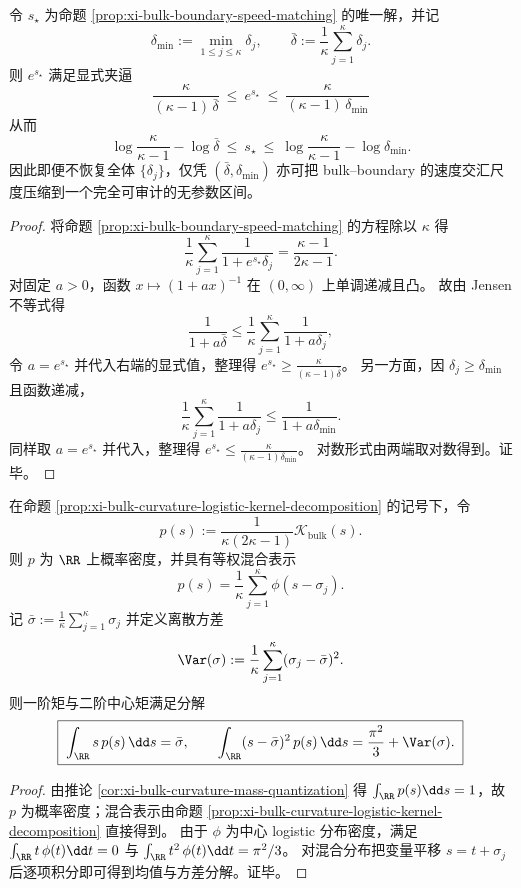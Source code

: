 \begin{corollary}\label{cor:xi-bulk-boundary-speed-matching-scale-bracketing}
令 \(s_\star\) 为命题 \ref{prop:xi-bulk-boundary-speed-matching} 的唯一解，并记
\[
\delta_{\min}:=\min_{1\le j\le\kappa}\delta_j,
\qquad
\bar\delta:=\frac{1}{\kappa}\sum_{j=1}^{\kappa}\delta_j.
\]
则 \(e^{s_\star}\) 满足显式夹逼
\[
\boxed{\;
\frac{\kappa}{(\kappa-1)\,\bar\delta}\ \le\ e^{s_\star}\ \le\ \frac{\kappa}{(\kappa-1)\,\delta_{\min}}\;}
\]
从而
\[
\log\frac{\kappa}{\kappa-1}-\log\bar\delta\ \le\ s_\star\ \le\ \log\frac{\kappa}{\kappa-1}-\log\delta_{\min}.
\]
因此即便不恢复全体 \(\{\delta_j\}\)，仅凭 \((\bar\delta,\delta_{\min})\) 亦可把 bulk--boundary 的速度交汇尺度压缩到一个完全可审计的无参数区间。
\end{corollary}
\begin{proof}
将命题 \ref{prop:xi-bulk-boundary-speed-matching} 的方程除以 \(\kappa\) 得
\[
\frac{1}{\kappa}\sum_{j=1}^{\kappa}\frac{1}{1+e^{s_\star}\delta_j}=\frac{\kappa-1}{2\kappa-1}.
\]
对固定 \(a>0\)，函数 \(x\mapsto (1+ax)^{-1}\) 在 \((0,\infty)\) 上单调递减且凸。
故由 Jensen 不等式得
\[
\frac{1}{1+a\bar\delta}\le \frac{1}{\kappa}\sum_{j=1}^{\kappa}\frac{1}{1+a\delta_j},
\]
令 \(a=e^{s_\star}\) 并代入右端的显式值，整理得
\(
e^{s_\star}\ge \frac{\kappa}{(\kappa-1)\bar\delta}
\)。
另一方面，因 \(\delta_j\ge \delta_{\min}\) 且函数递减，
\[
\frac{1}{\kappa}\sum_{j=1}^{\kappa}\frac{1}{1+a\delta_j}\le \frac{1}{1+a\delta_{\min}}.
\]
同样取 \(a=e^{s_\star}\) 并代入，整理得
\(
e^{s_\star}\le \frac{\kappa}{(\kappa-1)\delta_{\min}}
\)。
对数形式由两端取对数得到。证毕。
\end{proof}

\begin{corollary}\label{cor:xi-bulk-curvature-probability-moments}
在命题 \ref{prop:xi-bulk-curvature-logistic-kernel-decomposition} 的记号下，令
\[
p(s):=\frac{1}{\kappa(2\kappa-1)}\mathcal{K}_{\mathrm{bulk}}(s).
\]
则 \(p\) 为 \(\RR\) 上概率密度，并具有等权混合表示
\[
\boxed{\;
p(s)=\frac{1}{\kappa}\sum_{j=1}^{\kappa}\phi(s-\sigma_j).\;}
\]
记 \(\bar\sigma:=\frac{1}{\kappa}\sum_{j=1}^\kappa\sigma_j\) 并定义离散方差
\[
\Var(\sigma):=\frac{1}{\kappa}\sum_{j=1}^{\kappa}(\sigma_j-\bar\sigma)^2.
\]
则一阶矩与二阶中心矩满足分解
\[
\boxed{\;
\int_{\RR}s\,p(s)\,\dd s=\bar\sigma,\qquad
\int_{\RR}(s-\bar\sigma)^2\,p(s)\,\dd s=\frac{\pi^2}{3}+\Var(\sigma).\;}
\]
\end{corollary}
\begin{proof}
由推论 \ref{cor:xi-bulk-curvature-mass-quantization} 得 \(\int_{\RR}p(s)\dd s=1\)，故 \(p\) 为概率密度；混合表示由命题 \ref{prop:xi-bulk-curvature-logistic-kernel-decomposition} 直接得到。
由于 \(\phi\) 为中心 logistic 分布密度，满足 \(\int_{\RR} t\,\phi(t)\dd t=0\) 与 \(\int_{\RR} t^2\,\phi(t)\dd t=\pi^2/3\)。
对混合分布把变量平移 \(s=t+\sigma_j\) 后逐项积分即可得到均值与方差分解。证毕。
\end{proof}

